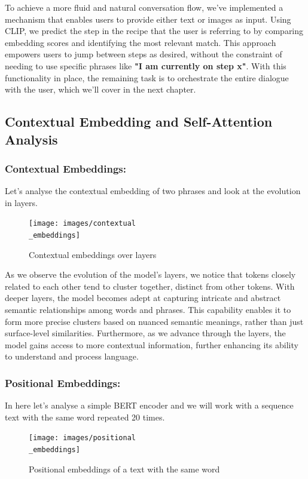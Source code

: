 \documentclass[runningheads]{llncs}
\begin{document}
To achieve a more fluid and natural conversation flow, we've implemented a mechanism that enables users to provide either text or images as input. Using CLIP, we predict the step in the recipe that the user is referring to by comparing embedding scores and identifying the most relevant match. This approach empowers users to jump between steps as desired, without the constraint of needing to use specific phrases like \textbf{"I am currently on step x"}. With this functionality in place, the remaining task is to orchestrate the entire dialogue with the user, which we'll cover in the next chapter.

\subsection{Contextual Embedding and Self-Attention Analysis}
\subsubsection{Contextual Embeddings:}
Let's analyse the contextual embedding of two phrases and look at the evolution in layers.

\begin{figure}[!htbp]
    \center
    \texttt{[image: images/contextual\\\_embeddings]}
    \caption{Contextual embeddings over layers}
\end{figure}
As we observe the evolution of the model's layers, we notice that tokens closely related to each other tend to cluster together, distinct from other tokens. With deeper layers, the model becomes adept at capturing intricate and abstract semantic relationships among words and phrases. This capability enables it to form more precise clusters based on nuanced semantic meanings, rather than just surface-level similarities. Furthermore, as we advance through the layers, the model gains access to more contextual information, further enhancing its ability to understand and process language.\subsubsection{Positional Embeddings:}
In here let's analyse a simple BERT encoder and we will work with a sequence text with the same word repeated 20 times.\\[10pt]

\begin{figure}[!htbp]
    \center
    \texttt{[image: images/positional\\\_embeddings]}
    \caption{Positional embeddings of a text with the same word}
\end{figure}
\end{document}
